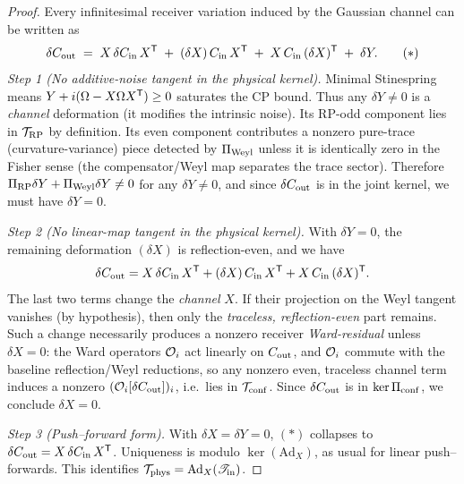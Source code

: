\documentclass[10pt]{article}
\theoremstyle{definition}
\theoremstyle{plain}
\begin{document}
\begin{proof}
Every infinitesimal receiver variation induced by the Gaussian channel can be written as
\[
\delta C_{\rm out}\;=\;X\,\delta C_{\rm in}\,X^{\sf T}\;+\;(\delta X)\,C_{\rm in}\,X^{\sf T}
\;+\;X\,C_{\rm in}\,(\delta X)^{\sf T}\;+\;\delta Y.
\tag{$\ast$}
\]
\emph{Step 1 (No additive-noise tangent in the physical kernel).}
Minimal Stinespring means $Y+i(\Omega-X\Omega X^{\sf T})\ge 0$ saturates the CP bound.
Thus any $\delta Y\neq 0$ is a \emph{channel} deformation (it modifies the intrinsic noise). Its
RP-odd component lies in $\mathcal T_{\rm RP}$ by definition. Its even component contributes a
nonzero pure-trace (curvature-variance) piece detected by $\Pi_{\rm Weyl}$ unless it is identically
zero in the Fisher sense (the compensator/Weyl map separates the trace sector). Therefore
$\Pi_{\rm RP}\delta Y+\Pi_{\rm Weyl}\delta Y\neq 0$ for any $\delta Y\neq 0$, and since
$\delta C_{\rm out}$ is in the joint kernel, we must have $\delta Y=0$.

\emph{Step 2 (No linear-map tangent in the physical kernel).}
With $\delta Y=0$, the remaining deformation $(\delta X)$ is reflection-even, and we have
\[
\delta C_{\rm out}=X\,\delta C_{\rm in}\,X^{\sf T}+(\delta X)\,C_{\rm in}\,X^{\sf T}
+X\,C_{\rm in}\,(\delta X)^{\sf T}.
\]
The last two terms change the \emph{channel} \(X\). If their projection on the Weyl tangent vanishes
(by hypothesis), then only the \emph{traceless, reflection-even} part remains. Such a change necessarily
produces a nonzero receiver \emph{Ward-residual} unless $\delta X=0$:
the Ward operators ${\cal O}_i$ act linearly on $C_{\rm out}$, and ${\cal O}_i$ commute with
the baseline reflection/Weyl reductions, so any nonzero even, traceless channel term induces
a nonzero $({\cal O}_i[\delta C_{\rm out}])_i$, i.e.\ lies in $\mathcal T_{\rm conf}$.
Since $\delta C_{\rm out}$ is in $\ker\Pi_{\rm conf}$, we conclude $\delta X=0$.

\emph{Step 3 (Push–forward form).}
With $\delta X=\delta Y=0$, \((\ast)\) collapses to $\delta C_{\rm out}=X\,\delta C_{\rm in}\,X^{\sf T}$.
Uniqueness is modulo $\ker(\mathrm{Ad}_X)$, as usual for linear push–forwards. This identifies
$\mathcal T_{\rm phys}=\mathrm{Ad}_X(\mathscr T_{\rm in})$.
\end{proof}
\end{document}

